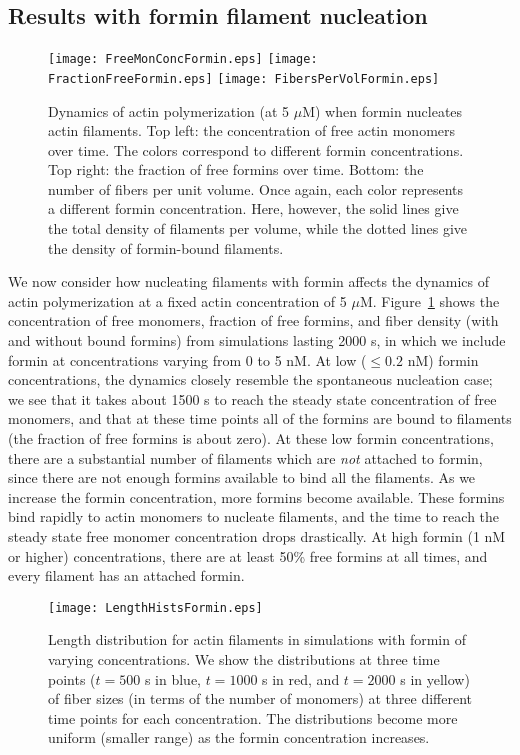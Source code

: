 \documentclass[11pt]{article}
\begin{document}
\subsection{Results with formin filament nucleation}
\begin{figure}
\centering
\texttt{[image: FreeMonConcFormin.eps]}
\texttt{[image: FractionFreeFormin.eps]}
\texttt{[image: FibersPerVolFormin.eps]}
\caption{\label{fig:ActinNucWithFormin}Dynamics of actin polymerization (at 5 $\mu$M) when formin nucleates actin filaments. Top left: the concentration of free actin monomers over time. The colors correspond to different formin concentrations. Top right: the fraction of free formins over time. Bottom: the number of fibers per unit volume. Once again, each color represents a different formin concentration. Here, however, the solid lines give the total density of filaments per volume, while the dotted lines give the density of formin-bound filaments.}
\end{figure}

We now consider how nucleating filaments with formin affects the dynamics of actin polymerization at a fixed actin concentration of 5 $\mu$M. Figure\ \ref{fig:ActinNucWithFormin} shows the concentration of free monomers, fraction of free formins, and fiber density (with and without bound formins) from simulations lasting 2000 s, in which we include formin at concentrations varying from 0 to 5 nM. At low ($\leq 0.2$ nM) formin concentrations, the dynamics closely resemble the spontaneous nucleation case; we see that it takes about 1500 s to reach the steady state concentration of free monomers, and that at these time points all of the formins are bound to filaments (the fraction of free formins is about zero). At these low formin concentrations, there are a substantial number of filaments which are \emph{not} attached to formin, since there are not enough formins available to bind all the filaments. As we increase the formin concentration, more formins become available. These formins bind rapidly to actin monomers to nucleate filaments, and the time to reach the steady state free monomer concentration drops drastically. At high formin (1 nM or higher) concentrations, there are at least 50\% free formins at all times, and every filament has an attached formin. 

\begin{figure}
\centering
\texttt{[image: LengthHistsFormin.eps]}
\caption{\label{fig:HistsWithFormin}Length distribution for actin filaments in simulations with formin of varying concentrations. We show the distributions at three time points ($t=500$ s in blue, $t=1000$ s in red, and $t=2000$ s in yellow) of fiber sizes (in terms of the number of monomers) at three different time points for each concentration. The distributions become more uniform (smaller range) as the formin concentration increases.}
\end{figure}
\end{document}

